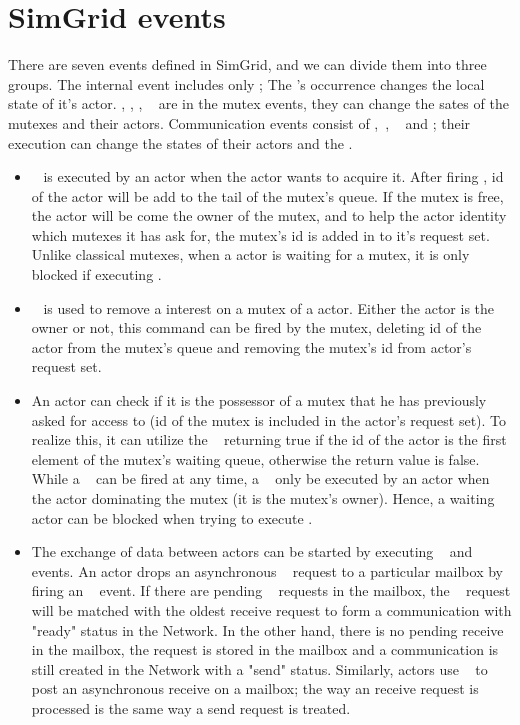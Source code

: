 \documentclass[a4paper,11pt]{article}
\begin{document}
\begin{itemize}[noitemsep]
\begin{tabular}{|c||c|c|c|}
\end{tabular}

\section{SimGrid events}
There are seven events defined in SimGrid, and we can divide them into three groups. The internal event includes only \localcomputation; The \localcomputation's occurrence changes the local state of it's actor. \mutexlock, \mutexunlock, \mutextest, \mutexwait~ are in the mutex events, they can change the sates of the mutexes and their actors. Communication events consist of \asynsend,~\asynreceive, \test~ and \wait; their execution can change the states of their actors and the \Mailboxes.  \\
\begin{itemize}[noitemsep]
\setlength{\itemsep}{3pt}
\item \mutexlock~ is executed by an actor when the actor wants to acquire it. After firing \mutexlock, id of the actor will be add to the tail of the mutex's queue. If the mutex is free, the actor will be come the owner of the mutex, and to help the actor identity which mutexes it has ask for, the mutex's id is added in to it's request set. Unlike classical mutexes, when a actor is waiting for a mutex, it is only blocked if executing \mutexwait. 
\item \mutexunlock~ is used to remove a interest on a mutex of a actor. Either the actor is the owner or not, this command can be fired by the mutex, deleting id of the actor from the mutex's queue and removing the mutex's id from actor's request set. 
\item An actor can check if it is the possessor of a mutex that he has previously asked for access to (id of the mutex is included in the actor's request set). To realize this, it can utilize the \mutextest~ returning true if the id of the actor is the first element of the mutex's waiting queue, otherwise the return value is false. While a \mutextest~ can be fired at any time, a \mutexwait~ only be executed by an actor when the actor dominating the mutex (it is the mutex's owner). Hence, a waiting actor can be blocked when trying to execute \mutexwait. 

\item The exchange of data between actors can be started by executing  \asynsend~ and \asynreceive~ events. An actor drops an asynchronous \send~ request to a particular mailbox by firing an \asynsend~ event. If there are pending \receive~ requests in the mailbox, the \send~ request will be matched with the oldest receive request to form a communication with "ready" status in the Network. In the other hand, there is no pending receive in the mailbox, the request is stored in the mailbox and a communication is still created in the Network with a "send" status.  Similarly, actors use \asynreceive~ to post an asynchronous receive on a mailbox; the way an receive request is processed is the same way a send request is treated. 


\end{itemize}
\end{itemize}
\end{document}
